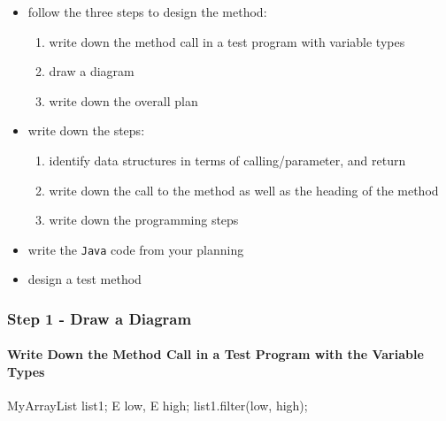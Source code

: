 \begin{itemize}
    \item [1.] follow the three steps to design the method:
        \begin{enumerate}
            \item write down the method call in a test program with variable types
            \item draw a diagram 
            \item write down the overall plan 
        \end{enumerate}
\end{itemize}

\begin{itemize}
    \item [2.] write down the steps:
        \begin{enumerate}
            \item identify data structures in terms of calling/parameter, and return 
            \item write down the call to the method as well as the heading of the method
            \item write down the programming steps
        \end{enumerate}
\end{itemize}

\begin{itemize}
    \item [4.] write the \texttt{Java} code from your planning
    \item [5.] design a test method
\end{itemize}

\subsubsection{Step 1 - Draw a Diagram}

\paragraph{Write Down the Method Call in a Test Program with the Variable Types}

\noindent
\begin{minipage}{0.3\textwidth}
    \phantom{text}
\end{minipage}
\begin{minipage}{0.4\textwidth}
    \begin{tightcode}
MyArrayList list1; E low, E high;
list1.filter(low, high);
    \end{tightcode}
\end{minipage}

